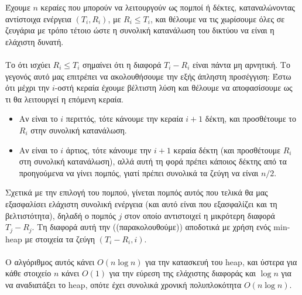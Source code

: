 \documentclass[12pt,a4paper]{article}
\begin{document}
    Έχουμε \( n \) κεραίες που μπορούν να  λειτουργούν ως πομποί ή δέκτες,
    καταναλώνοντας αντίστοιχα ενέργεια \( (T_i, R_i) \), με \( R_i \le T_i \),
    και θέλουμε να τις χωρίσουμε όλες σε ζευγάρια με τρόπο τέτοιο ώστε η
    συνολική κατανάλωση του δικτύου να είναι η ελάχιστη δυνατή.\\
    \\
    Το ότι ισχύει \( R_i \le T_i \) σημαίνει ότι η διαφορά \( T_i - R_i \)
    είναι πάντα μη αρνητική. Το γεγονός αυτό μας επιτρέπει να ακολουθήσουμε την
    εξής άπληστη προσέγγιση: Έστω ότι μέχρι την \( i \)-οστή
    κεραία έχουμε βέλτιστη λύση και θέλουμε να αποφασίσουμε ως τι θα 
    λειτουργεί η επόμενη κεραία.
    \begin{itemize}
      \item Αν είναι το \( i \) περιττός, τότε κάνουμε 
            την κεραία \( i + 1 \) δέκτη, και προσθέτουμε το \( R_i \) στην
            συνολική κατανάλωση.
      \item Αν είναι το \( i \) άρτιος, τότε κάνουμε την \( i + 1 \) κεραία
            δέκτη (και προσθέτουμε \( R_i \) στη συνολική κατανάλωση), αλλά αυτή
            τη φορά πρέπει κάποιος δέκτης από τα προηγούμενα να
            γίνει πομπός, γιατί πρέπει συνολικά τα ζεύγη να είναι \( n/2 \).
    \end{itemize}
    Σχετικά με την επιλογή του πομπού, γίνεται πομπός αυτός που τελικά θα μας
    εξασφαλίσει ελάχιστη συνολική ενέργεια (και αυτό είναι που εξασφαλίζει και
    τη βελτιστότητα), δηλαδή ο πομπός \( j \) στον οποίο αντιστοιχεί η μικρότερη
    διαφορά \( T_j - R_j \). Τη διαφορά αυτή την ((παρακολουθούμε)) αποδοτικά
    με χρήση ενός {\latintext min-heap} με στοιχεία τα ζεύγη \( (Τ_i - R_i,
    i) \).\\
    \\
    O αλγόριθμος αυτός κάνει \( Ο(n\log{n}) \) για την κατασκευή του {\latintext
    heap}, και ύστερα για κάθε στοιχείο \( n \) κάνει \( O(1) \) για την
    εύρεση της ελάχιστης διαφοράς και \( \log{n} \) για να αναδιατάξει το
    {\latintext heap}, οπότε έχει συνολικά χρονική πολυπλοκότητα \( O(n\log{n})
    \).
\end{document}
